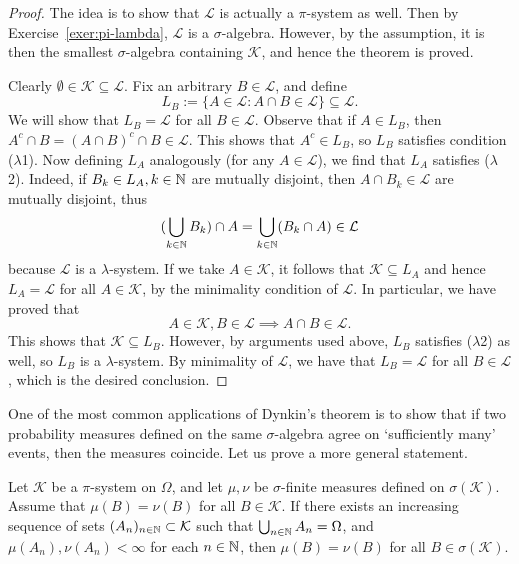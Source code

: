 \begin{proof}
The idea is to show that $\mathcal{L}$ is actually a $\pi$-system as well. Then by Exercise~\ref{exer:pi-lambda}, $\mathcal{L}$ is a $\sigma$-algebra. However, by the assumption, it is then the smallest $\sigma$-algebra containing $\mathcal{K}$, and hence the theorem is proved.

Clearly $\emptyset\in\mathcal{K}\subseteq\mathcal{L}$. Fix an arbitrary $B\in\mathcal{L}$, and define
\begin{equation*}
    L_B := \{ A\in\mathcal{L} : A\cap B\in\mathcal{L}\} \subseteq\mathcal{L}.
\end{equation*}
We will show that $L_B=\mathcal{L}$ for all $B\in\mathcal{L}$. Observe that if $A\in L_B$, then $A^c\cap B = (A\cap B)^c\cap B\in\mathcal{L}$. This shows that $A^c\in L_B$, so $L_B$ satisfies condition ($\lambda$1). Now defining $L_A$ analogously (for any $A\in\mathcal{L}$), we find that $L_A$ satisfies ($\lambda$2). Indeed, if $B_k \in L_A, k\in\mathbb{N}$ are mutually disjoint, then $A\cap B_k\in\mathcal{L}$ are mutually disjoint, thus
\begin{equation*}
    (\bigcup_{k\in\mathbb{N}}B_k)\cap A = \bigcup_{k\in\mathbb{N}}(B_k \cap A)\in\mathcal{L}
\end{equation*}
because $\mathcal{L}$ is a $\lambda$-system. If we take $A\in\mathcal{K}$, it follows that $\mathcal{K}\subseteq L_A$ and hence $L_A=\mathcal{L}$ for all $A\in\mathcal{K}$, by the minimality condition of $\mathcal{L}$. In particular, we have proved that
\begin{equation*}
    A\in\mathcal{K}, B\in\mathcal{L} \implies A\cap B\in\mathcal{L}.
\end{equation*}
This shows that $\mathcal{K}\subseteq L_B$. However, by arguments used above, $L_B$ satisfies ($\lambda$2) as well, so $L_B$ is a $\lambda$-system. By minimality of $\mathcal{L}$, we have that $L_B=\mathcal{L}$ for all $B\in\mathcal{L}$, which is the desired conclusion.
\end{proof}

One of the most common applications of Dynkin's theorem is to show that if two probability measures defined on the same $\sigma$-algebra agree on `sufficiently many' events, then the measures coincide. Let us prove a more general statement.
\begin{theorem}
\label{thm:unique-meas}
    Let $\mathcal{K}$ be a $\pi$-system on $\Omega$, and let $\mu,\nu$ be $\sigma$-finite measures defined on $\sigma(\mathcal{K})$. Assume that $\mu(B)=\nu(B)$ for all $B\in\mathcal{K}$. If there exists an increasing sequence of sets $(A_n)_{n\in\mathbb{N}}\subset\mathcal{K}$ such that $\bigcup_{n\in\mathbb{N}}A_n = \Omega$, and $\mu(A_n), \nu(A_n)<\infty$ for each $n\in\mathbb{N}$, then $\mu(B)=\nu(B)$ for all $B\in\sigma(\mathcal{K})$.
\end{theorem}

